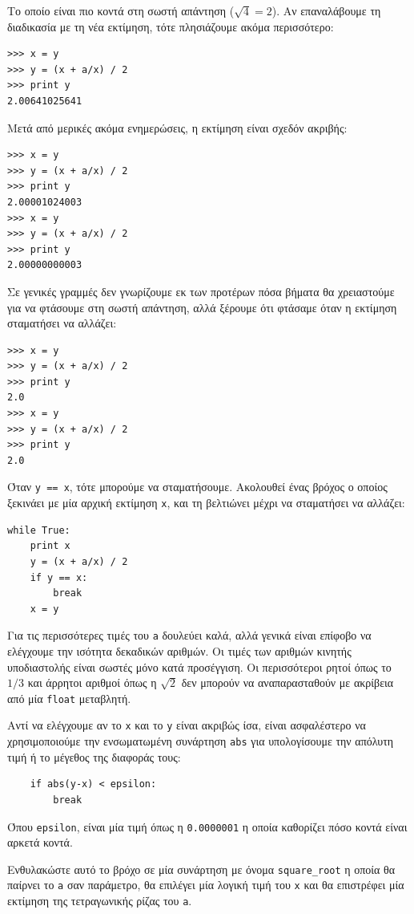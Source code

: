 \documentclass[10pt]{book}
\begin{document}
Το οποίο είναι πιο κοντά στη σωστή απάντηση ($\sqrt{4} = 2$). Αν
επαναλάβουμε τη διαδικασία με τη νέα εκτίμηση, τότε πλησιάζουμε ακόμα περισσότερο:

\begin{verbatim}
>>> x = y
>>> y = (x + a/x) / 2
>>> print y
2.00641025641
\end{verbatim}
%

Μετά από μερικές ακόμα ενημερώσεις, η εκτίμηση είναι σχεδόν ακριβής:

\begin{verbatim}
>>> x = y
>>> y = (x + a/x) / 2
>>> print y
2.00001024003
>>> x = y
>>> y = (x + a/x) / 2
>>> print y
2.00000000003
\end{verbatim}
%

Σε γενικές γραμμές δεν γνωρίζουμε εκ των προτέρων πόσα βήματα θα χρειαστούμε
για να φτάσουμε στη σωστή απάντηση, αλλά ξέρουμε ότι φτάσαμε όταν η εκτίμηση
σταματήσει να αλλάζει:

\begin{verbatim}
>>> x = y
>>> y = (x + a/x) / 2
>>> print y
2.0
>>> x = y
>>> y = (x + a/x) / 2
>>> print y
2.0
\end{verbatim}
%

Όταν {\tt y == x}, τότε μπορούμε να σταματήσουμε. Ακολουθεί ένας βρόχος ο
οποίος ξεκινάει με μία αρχική εκτίμηση {\tt x}, και τη βελτιώνει μέχρι
να σταματήσει να αλλάζει:

\begin{verbatim}
while True:
    print x
    y = (x + a/x) / 2
    if y == x:
        break
    x = y
\end{verbatim}
%

Για τις περισσότερες τιμές του {\tt a} δουλεύει καλά, αλλά γενικά
είναι επίφοβο να ελέγχουμε την ισότητα δεκαδικών αριθμών. Οι τιμές των αριθμών
κινητής υποδιαστολής είναι σωστές μόνο κατά προσέγγιση. Οι περισσότεροι ρητοί
όπως το  $1/3$  και άρρητοι αριθμοί όπως η  $\sqrt{2}$  δεν μπορούν
να αναπαρασταθούν με ακρίβεια από μία {\tt float} μεταβλητή.

Αντί να ελέγχουμε αν το {\tt x} και το {\tt y} είναι ακριβώς ίσα,
είναι ασφαλέστερο να χρησιμοποιούμε την ενσωματωμένη συνάρτηση  {\tt abs}  για
υπολογίσουμε την απόλυτη τιμή ή το μέγεθος της διαφοράς τους:

\begin{verbatim}
    if abs(y-x) < epsilon:
        break
\end{verbatim}
%

Όπου \verb"epsilon", είναι μία τιμή όπως η {\tt 0.0000001} 
η οποία καθορίζει πόσο κοντά είναι αρκετά κοντά.
\\
\begin{exercise}

Ενθυλακώστε αυτό το βρόχο σε μία συνάρτηση με όνομα \verb"square_root" 
η οποία θα παίρνει το {\tt a} σαν παράμετρο, θα επιλέγει μία λογική
τιμή του {\tt x} και θα επιστρέφει μία εκτίμηση της τετραγωνικής ρίζας του
{\tt a}.
\end{exercise}
\end{document}

